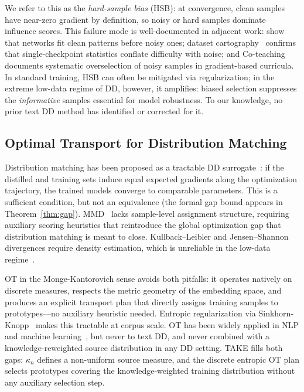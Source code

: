 \begin{foldable} %
  We refer to this as the \emph{hard-sample bias} (HSB): at convergence, clean samples have near-zero gradient by definition, so noisy or hard samples dominate influence scores.
  This failure mode is well-documented in adjacent work: \cite{arpit2017closer} show that networks fit clean patterns before noisy ones; dataset cartography~\cite{swayamdipta2020dataset} confirms that single-checkpoint statistics conflate difficulty with noise; and Co-teaching~\cite{han2018co} documents systematic overselection of noisy samples in gradient-based curricula.
  In standard training, HSB can often be mitigated via regularization; in the extreme low-data regime of DD, however, it amplifies: biased selection suppresses the \emph{informative} samples essential for model robustness.
  To our knowledge, no prior text DD method has identified or corrected for it.
\end{foldable}

\subsection{Optimal Transport for Distribution Matching} \label{sec:02-related-ot}
\begin{foldable} %
  Distribution matching has been proposed as a tractable DD surrogate~\cite{zhao2023dataset}: if the distilled and training sets induce equal expected gradients along the optimization trajectory, the trained models converge to comparable parameters.
  This is a sufficient condition, but not an equivalence (the formal gap bound appears in Theorem~\ref{thm:gap}).
  MMD~\cite{gretton2012kernel} lacks sample-level assignment structure, requiring auxiliary scoring heuristics that reintroduce the global optimization gap that distribution matching is meant to close.
  Kullback--Leibler and Jensen--Shannon divergences require density estimation, which is unreliable in the low-data regime~\cite{paninski2003estimation}.
\end{foldable}

\begin{foldable} %
  OT in the Monge-Kantorovich sense avoids both pitfalls: it operates natively on discrete measures, respects the metric geometry of the embedding space, and produces an explicit transport plan that directly assigns training samples to prototypes---no auxiliary heuristic needed.
  Entropic regularization via Sinkhorn-Knopp~\cite{cuturi2013sinkhorn} makes this tractable at corpus scale.
  OT has been widely applied in NLP and machine learning~\cite{kusner2015word,tolstikhin2018wasserstein,courty2016optimal,arjovsky2017wasserstein}, but never to text DD, and never combined with a knowledge-reweighted source distribution in any DD setting.
  TAKE fills both gaps: $\kappa_n$ defines a non-uniform source measure, and the discrete entropic OT plan selects prototypes covering the knowledge-weighted training distribution without any auxiliary selection step.
\end{foldable}
